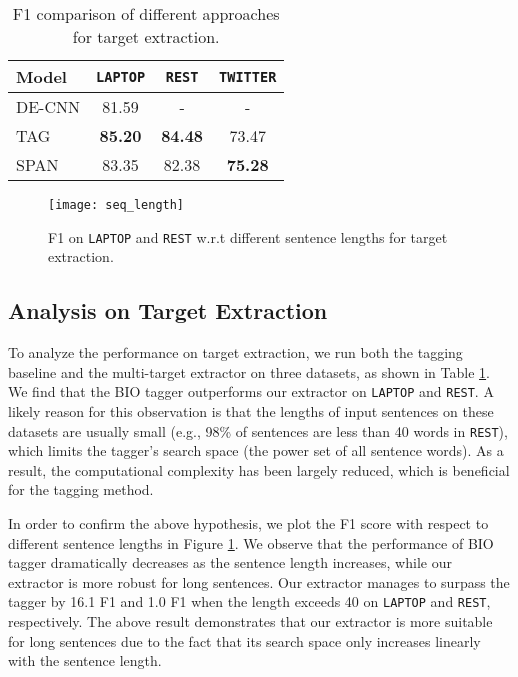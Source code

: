 \documentclass[11pt,a4paper]{article}
\begin{document}
\begin{table}
\begin{center}
\begin{tabular}{l|c|c|c}
\toprule
Model  & \texttt{LAPTOP}  & \texttt{REST} & \texttt{TWITTER} \\ 
\midrule
DE-CNN  & 81.59 & - & -  \\
TAG     & \textbf{85.20} & \textbf{84.48} & 73.47  \\
SPAN    & 83.35 & 82.38 & \textbf{75.28}  \\
\bottomrule
\end{tabular}
\caption{\label{tab:target_extra} F1 comparison of different approaches for target extraction.}
\end{center}
\end{table}

\begin{figure}
\center
\texttt{[image: seq\_length]}
\caption{F1 on \texttt{LAPTOP} and \texttt{REST} w.r.t different sentence lengths for target extraction.}
\label{fig:seq_len}
\end{figure}


\subsection{Analysis on Target Extraction}
To analyze the performance on target extraction, we run both the tagging baseline and the multi-target extractor on three datasets, as shown in Table \ref{tab:target_extra}.
We find that the BIO tagger outperforms our extractor on \texttt{LAPTOP} and \texttt{REST}.
A likely reason for this observation is that the lengths of input sentences on these datasets are usually small (e.g., 98\% of sentences are less than 40 words in \texttt{REST}), which limits the tagger's search space (the power set of all sentence words).
As a result, the computational complexity has been largely reduced, which is beneficial for the tagging method.

In order to confirm the above hypothesis, we plot the F1 score with respect to different sentence lengths in Figure \ref{fig:seq_len}. 
We observe that the performance of BIO tagger dramatically decreases as the sentence length increases, while our extractor is more robust for long sentences.
Our extractor manages to surpass the tagger by 16.1 F1 and 1.0 F1 when the length exceeds 40 on \texttt{LAPTOP} and \texttt{REST}, respectively.
The above result demonstrates that our extractor is more suitable for long sentences due to the fact that its search space only increases linearly with the sentence length.
\end{document}
